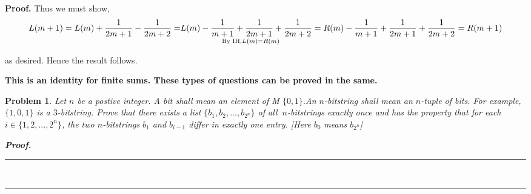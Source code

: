 \documentclass{article}
\newtheorem{problem}[theorem]{Problem}
\newenvironment{proof}[1][Proof]{\noindent\textbf{#1.} }{\ \rule{0.5em}{0.5em}}
\begin{document}
\begin{proof}
Thus we must show, 
\[
L(m+1)=L(m)+\frac{1}{2m+1}-\frac{1}{2m+2}=\underset{\text{By IH,}L(m)=R(m)}{%
L(m)-\frac{1}{m+1}+\frac{1}{2m+1}+\frac{1}{2m+2}=}R(m)-\frac{1}{m+1}+\frac{1%
}{2m+1}+\frac{1}{2m+2}=R(m+1)
\]

as desired. Hence the result follows.

\textbf{This is an identity for finite sums. These types of questions can be
proved in the same.}

\begin{problem}
Let $n$ be a postive integer. A bit shall mean an element of M $\{0,1\}.$An $%
n$-bitstring shall mean an $n$-tuple of bits. For example, $\{1,0,1\}$ is a $%
3$-bitstring. Prove that there exists a list $\{b_{1},b_{2},...,b_{2^{n}}\}$
of all $\ n$-bitstrings exactly once and has the property that for each $%
i\in \{1,2,...,2^{n}\}$, the two $n$-bitstrings $b_{1}$ and $b_{i-1}$ differ
in exactly one entry. [Here $b_{0}$ means $b_{2^{n}}$]

\begin{proof}
\end{proof}
\end{problem}
\end{proof}
\end{document}
